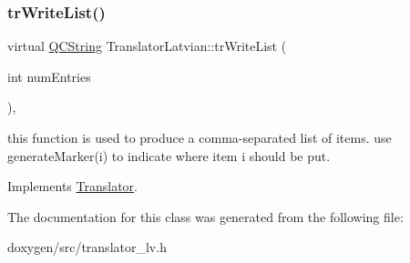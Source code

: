 \subsubsection{\texorpdfstring{trWriteList()}{trWriteList()}}
{\footnotesize\ttfamily virtual \mbox{\hyperlink{class_q_c_string}{Q\+C\+String}} Translator\+Latvian\+::tr\+Write\+List (\begin{DoxyParamCaption}\item[{int}]{num\+Entries }\end{DoxyParamCaption})\hspace{0.3cm}{\ttfamily [inline]}, {\ttfamily [virtual]}}

this function is used to produce a comma-\/separated list of items. use generate\+Marker(i) to indicate where item i should be put. 

Implements \mbox{\hyperlink{class_translator}{Translator}}.



The documentation for this class was generated from the following file\+:\begin{DoxyCompactItemize}
\item 
doxygen/src/translator\+\_\+lv.\+h\end{DoxyCompactItemize}
